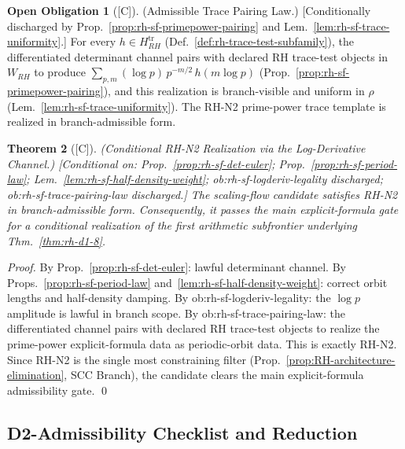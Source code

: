 \documentclass[12pt,oneside]{amsbook}
\theoremstyle{plain}
\newtheorem{theorem}{Theorem}[section]
\theoremstyle{definition}
\newtheorem{obligation}[theorem]{Open Obligation}
\theoremstyle{remark}
\newcommand{\status}[1]{\textup{[#1]}}
\begin{document}
\begin{obligation}[\status{C}]\label{ob:rh-sf-trace-pairing-law}
\textup{(Admissible Trace Pairing Law.)}
\textup{[Conditionally discharged by
Prop.~\ref{prop:rh-sf-primepower-pairing} and
Lem.~\ref{lem:rh-sf-trace-uniformity}.]}
For every $h \in H_{RH}^{\mathrm{tr}}$ (Def.~\ref{def:rh-trace-test-subfamily}),
the differentiated determinant channel pairs with declared RH
trace-test objects in $W_{RH}$ to produce
$\sum_{p,m}(\log p)\,p^{-m/2}\,h(m\log p)$
(Prop.~\ref{prop:rh-sf-primepower-pairing}),
and this realization is branch-visible and uniform in $\rho$
(Lem.~\ref{lem:rh-sf-trace-uniformity}).
The RH-N2 prime-power trace template is realized in
branch-admissible form.
\end{obligation}

\begin{theorem}[\status{C}]\label{thm:rh-og-5}
\textup{(Conditional RH-N2 Realization via the Log-Derivative Channel.)}
\textup{[Conditional on: Prop.~\ref{prop:rh-sf-det-euler};
Prop.~\ref{prop:rh-sf-period-law};
Lem.~\ref{lem:rh-sf-half-density-weight};
ob:rh-sf-logderiv-legality discharged;
ob:rh-sf-trace-pairing-law discharged.]}
The scaling-flow candidate satisfies RH-N2 in branch-admissible
form. Consequently, it passes the main explicit-formula gate for a
conditional realization of the first arithmetic subfrontier underlying
Thm.~\ref{thm:rh-d1-8}.
\end{theorem}

\begin{proof}
By Prop.~\ref{prop:rh-sf-det-euler}: lawful determinant channel. By
Props.~\ref{prop:rh-sf-period-law} and~\ref{lem:rh-sf-half-density-weight}:
correct orbit lengths and half-density damping. By
ob:rh-sf-logderiv-legality: the $\log p$ amplitude is lawful in
branch scope. By ob:rh-sf-trace-pairing-law: the differentiated
channel pairs with declared RH trace-test objects to realize the
prime-power explicit-formula data as periodic-orbit data. This is
exactly RH-N2. Since RH-N2 is the single most constraining filter
(Prop.~\ref{prop:RH-architecture-elimination}, SCC Branch), the
candidate clears the main explicit-formula admissibility gate. \qed
\end{proof}

\subsection{D2-Admissibility Checklist and Reduction}
\end{document}
